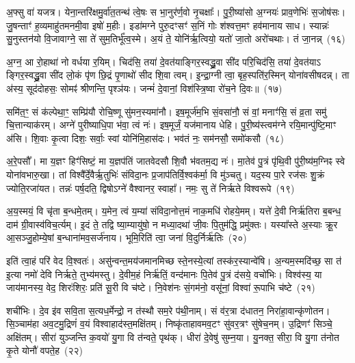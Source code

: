 अ॒फ्सु वा॑ यजत्र। येना॒न्तरि॑क्षमु॒र्वा॑त॒तन्थ॑ त्वे॒षः स भा॒नुर॑र्ण॒वो नृ॒चक्षाः᳚। पु॒री॒ष्या॑सो अ॒ग्नयः॑ प्राव॒णेभिः॑ स॒जोष॑सः। जु॒षन्ताꣳ॑ ह॒व्यमाहु॑तमनमी॒वा इषो॑ म॒हीः। इडा॑मग्ने पुरु॒दꣳसꣳ॑ स॒निं गोः श॑श्वत्त॒मꣳ हव॑मानाय साध। स्यान्नः॑ सु॒नुस्तन॑यो वि॒जावाग्ने॒ सा ते॑ सुम॒तिर्भू᳚त्व॒स्मे। अ॒यं ते॒ योनि॑र्\mbox{}ऋ॒त्वियो॒ यतो॑ जा॒तो अरो॑चथाः। तं जा॒नन्न्~(१६)

अ॒ग्न॒ आ रो॒हाथा॑ नो वर्धया र॒यिम्। चिद॑सि॒ तया॑ दे॒वत॑याङ्गिर॒स्वद्ध्रु॒वा सी॑द परि॒चिद॑सि॒ तया॑ दे॒वत॑या\-ऽ ङ्गिर॒स्वद्ध्रु॒वा सी॑द लो॒कं पृ॑ण छि॒द्रं पृ॒णाथो॑ सीद शि॒वा त्वम्। इ॒न्द्रा॒ग्नी त्वा॒ बृह॒स्पति॑र॒स्मिन् योना॑वसीषदन्न्। ता अ॑स्य॒ सूद॑दोहसः॒ सोमꣴ॑ श्रीणन्ति॒ पृश्ञ॑यः। जन्मं॑ दे॒वानां॒ विश॑स्त्रि॒ष्वा रो॑च॒ने दि॒वः॥~(१७)

{\anuvakamend[{अ॒स्त्वोष॑धीषु जा॒नन्न॒ष्टाच॑त्वारिꣳशच्च}]}%

समि॑त॒ꣳ॒ सं क॑ल्पेथा॒ꣳ॒ सम्प्रि॑यौ रोचि॒ष्णू सु॑मन॒स्यमा॑नौ। इष॒मूर्ज॑म॒भि सं॒वसा॑नौ॒ सं वां॒ मनाꣳ॑सि॒ सं व्र॒ता समु॑ चि॒त्तान्याक॑रम्। अग्ने॑ पुरीष्याधि॒पा भ॑वा॒ त्वं नः॑। इष॒मूर्जं॒ यज॑मानाय धेहि। पु॒री॒ष्य॑स्त्वम॑ग्ने रयि॒मान्पु॑ष्टि॒माꣳ अ॑सि। शि॒वाः कृ॒त्वा दिशः॒ सर्वाः॒ स्वां योनि॑मि॒हास॑दः। भव॑तं नः॒ सम॑नसौ॒ समो॑कसौ~(१८)

अ॒रे॒पसौ᳚। मा य॒ज्ञꣳ हिꣳ॑सिष्टं॒ मा य॒ज्ञप॑तिं जातवेदसौ शि॒वौ भ॑वतम॒द्य नः॑। मा॒तेव॑ पु॒त्रं पृ॑थि॒वी पु॑री॒ष्य॑म॒ग्निꣴ स्वे योना॑वभारु॒खा। तां विश्वै᳚र्दे॒वैर्\mbox{}ऋ॒तुभिः॑ संविदा॒नः प्र॒जा\-प॑तिर्वि॒श्वक॑र्मा॒ वि मु॑ञ्चतु। यद॒स्य पा॒रे रज॑सः शु॒क्रं ज्योति॒रजा॑यत। तन्नः॑ पर्\mbox{}ष॒दति॒ द्विषो\-ऽग्ने॑ वैश्वानर॒ स्वाहा᳚। नमः॒ सु ते॑ निर्\mbox{}ऋते विश्वरूपे~(१९)

अ॒य॒स्मयं॒ वि चृ॑ता ब॒न्धमे॒तम्। य॒मेन॒ त्वं य॒म्या॑ संविदा॒नोत्त॒मं नाक॒मधि॑ रोहये॒मम्। यत्ते॑ दे॒वी निर्\mbox{}ऋ॑तिरा ब॒बन्ध॒ दाम॑ ग्री॒वास्व॑विच॒र्त्यम्। इ॒दं ते॒ तद्वि ष्या॒म्यायु॑षो॒ न मध्या॒दथा॑ जी॒वः पि॒तुम॑द्धि॒ प्रमु॑क्तः। यस्या᳚स्ते अ॒स्याः क्रू॒र आ॒सञ्जु॒होम्ये॒षां ब॒न्धाना॑मव॒सर्ज॑नाय। भूमि॒रिति॑ त्वा॒ जना॑ वि॒दुर्निर्\mbox{}ऋ॑तिः~(२०)

इति॑ त्वा॒हं परि॑ वेद वि॒श्वतः॑। असु॑न्वन्त॒मय॑जमानमिच्छ स्ते॒नस्ये॒त्यां तस्क॑र॒स्यान्वे॑षि। अ॒न्यम॒स्मदि॑च्छ॒ सा त॑ इ॒त्या नमो॑ देवि निर्\mbox{}ऋते॒ तुभ्य॑मस्तु। दे॒वीम॒हं निर्\mbox{}ऋ॑तिं॒ वन्द॑मानः पि॒तेव॑ पु॒त्रं द॑सये॒ वचो॑भिः। विश्व॑स्य॒ या जाय॑मानस्य॒ वेद॒ शिरः॑शिरः॒ प्रति॑ सू॒री वि च॑ष्टे। नि॒वेश॑नः सं॒गम॑नो॒ वसू॑नां॒ विश्वा॑ रू॒पाभि च॑ष्टे~(२१)

शची॑भिः। दे॒व इ॑व सवि॒ता स॒त्यध॒र्मेन्द्रो॒ न त॑स्थौ सम॒रे प॑थी॒नाम्। सं व॑र॒त्रा द॑धातन॒ निरा॑हा॒वान्कृ॑णोतन। सि॒ञ्चाम॑हा अव॒टमु॒द्रिणं॑ व॒यं विश्वाहाद॑स्त॒मक्षि॑तम्। निष्कृ॑ताहावमव॒टꣳ सु॑वर॒त्रꣳ सु॑षेच॒नम्। उ॒द्रिणꣳ॑ सिञ्चे॒ अक्षि॑तम्। सीरा॑ युञ्जन्ति क॒वयो॑ यु॒गा वि त॑न्वते॒ पृथ॑क्। धीरा॑ दे॒वेषु॑ सुम्न॒या। यु॒नक्त॒ सीरा॒ वि यु॒गा त॑नोत कृ॒ते योनौ॑ वपते॒ह~(२२)

